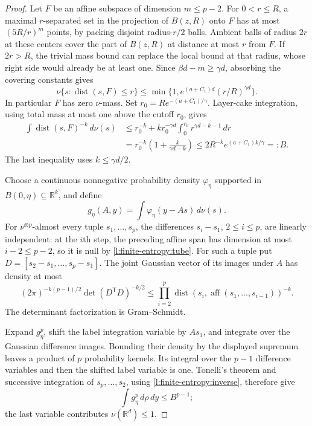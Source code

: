 \begin{proof}
Let \(F\) be an affine subspace of dimension \(m\le p-2\).
For \(0<r\le R\), a maximal \(r\)-separated set in the projection
of \(B(z,R)\) onto \(F\) has at most \((5R/r)^m\) points, by
packing disjoint radius-\(r/2\) balls.  Ambient balls of radius
\(2r\) at these centers cover the part of \(B(z,R)\) at distance
at most \(r\) from \(F\).  If \(2r>R\), the trivial mass bound
can replace the local bound at that radius, whose right side would
already be at least one.  Since \(\beta d-m\ge\gamma d\),
absorbing the covering constants gives
\begin{equation}\label{l:finite-entropy:tube}
 \nu\{s:\operatorname{dist}(s,F)\le r\}
 \le\min\{1,e^{(a+C_1)d}(r/R)^{\gamma d}\}.
\end{equation}
In particular \(F\) has zero \(\nu\)-mass.
Set \(r_0=R e^{-(a+C_1)/\gamma}\).  Layer-cake integration,
using total mass at most one above the cutoff \(r_0\), gives
\begin{equation}\label{l:finite-entropy:inverse}
 \begin{split}
 \int\operatorname{dist}(s,F)^{-k}\,d\nu(s)
 &\le r_0^{-k}
   +k r_0^{-\gamma d}\int_0^{r_0}r^{\gamma d-k-1}\,dr\\
 &=r_0^{-k}\left(1+\frac{k}{\gamma d-k}\right)
 \le2R^{-k}e^{(a+C_1)k/\gamma}=:B.
 \end{split}
\end{equation}
The last inequality uses \(k\le\gamma d/2\).

Choose a continuous nonnegative probability density \(\varphi_\eta\)
supported in \(B(0,\eta)\subseteq\mathbb R^k\), and define
\[
 g_\eta(A,y)=\int\varphi_\eta(y-As)\,d\nu(s).
\]
For \(\nu^{\otimes p}\)-almost every tuple \(s_1,\ldots,s_p\),
the differences \(s_i-s_1\), \(2\le i\le p\), are linearly
independent: at the \(i\)th step, the preceding affine span has
dimension at most \(i-2\le p-2\), so it is null by
\eqref{l:finite-entropy:tube}.  For such a tuple put
\(D=[s_2-s_1,\ldots,s_p-s_1]\).  The joint Gaussian vector of
its images under \(A\) has density at most
\[
 (2\pi)^{-k(p-1)/2}\det(D^{\mathsf T}D)^{-k/2}
 \le\prod_{i=2}^p
 \operatorname{dist}(s_i,\operatorname{aff}(s_1,\ldots,s_{i-1}))^{-k}.
\]
The determinant factorization is Gram--Schmidt.

Expand \(g_\eta^p\), shift the label integration variable by
\(As_1\), and integrate over the Gaussian difference images.
Bounding their density by the displayed supremum leaves a product of
\(p\) probability kernels.  Its integral over the \(p-1\) difference
variables and then the shifted label variable is one.  Tonelli's
theorem and successive integration of \(s_p,\ldots,s_2\), using
\eqref{l:finite-entropy:inverse}, therefore give
\[
 \int g_\eta^p\,d\rho\,dy\le B^{p-1};
\]
the last variable contributes \(\nu(\mathbb R^d)\le1\).


\end{proof}
